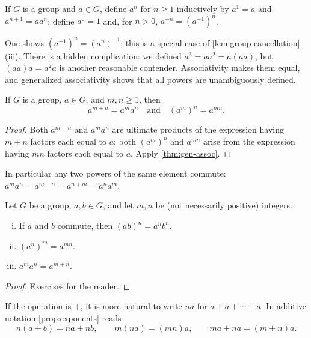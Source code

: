 \begin{definition}[Powers]
	If \(G\) is a group and \(a \in G\), define \(a^n\) for \(n \geq 1\) inductively by
	\(a^1 = a\) and \(a^{n+1} = a a^n\); define \(a^0 = 1\) and, for \(n > 0\),
	\(a^{-n} = (a^{-1})^n\).
\end{definition}

One shows \((a^{-1})^n = (a^n)^{-1}\); this is a special case of
\autoref{lem:group-cancellation}(iii). There is a hidden complication: we defined
\(a^3 = a a^2 = a(aa)\), but \((aa)a = a^2 a\) is another reasonable contender.
Associativity makes them equal, and generalized associativity shows that all powers are
unambiguously defined.

\begin{corollary}\label{cor:powers}
	If \(G\) is a group, \(a \in G\), and \(m, n \geq 1\), then
	\[
		a^{m+n} = a^m a^n \quad\text{and}\quad (a^m)^n = a^{mn}.
	\]
\end{corollary}

\begin{proof}
	Both \(a^{m+n}\) and \(a^m a^n\) are ultimate products of the expression having \(m+n\)
	factors each equal to \(a\); both \((a^m)^n\) and \(a^{mn}\) arise from the expression
	having \(mn\) factors each equal to \(a\). Apply \autoref{thm:gen-assoc}.
\end{proof}

In particular any two powers of the same element commute:
\(a^m a^n = a^{m+n} = a^{n+m} = a^n a^m\).

\begin{proposition}\label{prop:exponents}
	Let \(G\) be a group, \(a, b \in G\), and let \(m, n\) be (not necessarily positive)
	integers.
	\begin{enumerate}[(i)]
		\item If \(a\) and \(b\) commute, then \((ab)^n = a^n b^n\).
		\item \((a^n)^m = a^{mn}\).
		\item \(a^m a^n = a^{m+n}\).
	\end{enumerate}
\end{proposition}

\begin{proof}
	Exercises for the reader.
\end{proof}

\begin{notation}
	If the operation is \(+\), it is more natural to write \(na\) for
	\(a + a + \cdots + a\). In additive notation \autoref{prop:exponents} reads
	\[
		n(a+b) = na + nb, \qquad m(na) = (mn)a, \qquad ma + na = (m+n)a.
	\]
\end{notation}

